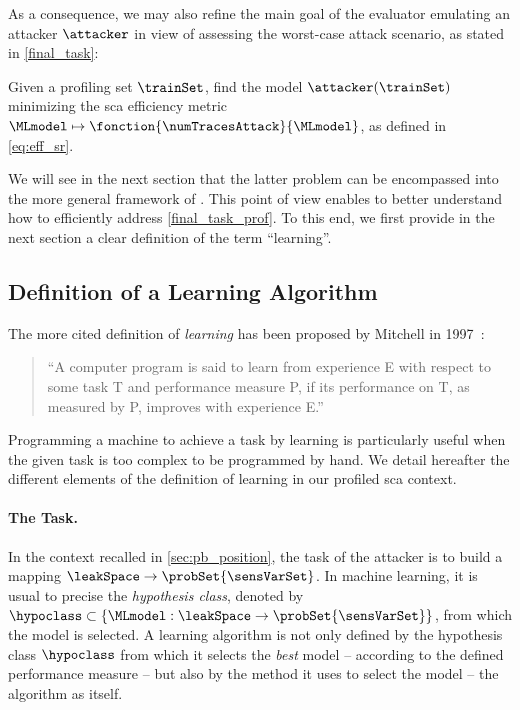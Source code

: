 As a consequence, we may also refine the main goal of the evaluator emulating an attacker \(\attacker\) in view of assessing the worst-case attack scenario, as stated in \autoref{final_task}:
\begin{problem}
	Given a profiling set \(\trainSet\), find the model \(\attacker(\trainSet)\) minimizing the \gls{sca} efficiency metric \(\MLmodel \mapsto \fonction{\numTracesAttack}{\MLmodel}\), as defined in \autoref{eq:eff_sr}.
	\label{final_task_prof}
\end{problem}

We will see in the next section that the latter problem can be encompassed into the more general framework of .
This point of view enables to better understand how to efficiently address \autoref{final_task_prof}.
To this end, we first provide in the next section a clear definition of the term ``learning''.

\subsection{Definition of a Learning Algorithm}
The more  cited definition of \emph{learning} has been proposed by Mitchell in 1997~\cite{mitchell_machine_1997}:
\begin{quote}
	``A computer program is said to learn from experience E with respect to some task T and performance measure P, if its performance on T, as measured by P, improves with experience E.''
\end{quote}
Programming a machine to achieve a task by learning is particularly useful when the given task is too complex to be programmed by hand.
We detail hereafter the different elements of the definition of learning in our profiled \gls{sca} context.

\paragraph{The Task.}
In the context recalled in \autoref{sec:pb_position}, the task of the attacker is to build a mapping \(\leakSpace \rightarrow \probSet{\sensVarSet}\).
In machine learning, it is usual to precise the \emph{hypothesis class}, denoted by \(\hypoclass \subset \{\MLmodel:\leakSpace \rightarrow \probSet{\sensVarSet}\}\), from which the model is selected.
A learning algorithm is not only defined by the hypothesis class \(\hypoclass\) from which it selects the \emph{best} model -- according to the defined performance measure -- but also by the method it uses to select the model -- \ie{} the algorithm as itself.

